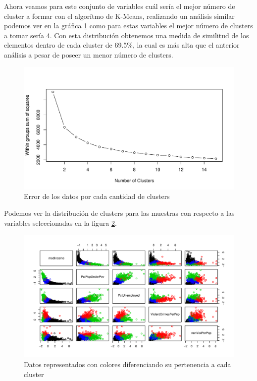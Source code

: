 \documentclass[a4paper,10pt,twocolumn]{article}
\begin{document}
	Ahora veamos para este conjunto de variables cuál sería el mejor número de cluster a formar con el algorítmo de K-Means, realizando un análisis similar podemos ver en la gráfica \ref{fig:cluster_n_2} como para estas variables el mejor número de clusters a tomar sería 4. Con esta distribución obtenemos una medida de similitud de los elementos dentro de cada cluster de 69.5\%, la cual es más alta que el anterior análisis a pesar de poseer un menor número de clusters.

	\begin{figure}[htb]
		\begin{center}
			\includegraphics[width=\columnwidth]{figures/cluster_n_2.pdf}
		\end{center}
		\caption{Error de los datos por cada cantidad de clusters \label{fig:cluster_n_2}}%
	\end{figure}

	Podemos ver la distribución de clusters para las muestras con respecto a las variables seleccionadas en la figura \ref{fig:plot_clusters}.

	\begin{figure}[htb]
		\begin{center}
			\includegraphics[width=\columnwidth]{figures/plot_clusters.pdf}
		\end{center}
		\caption{Datos representados con colores diferenciando su pertenencia a cada cluster \label{fig:plot_clusters}}%
	\end{figure}
	
\end{document}

